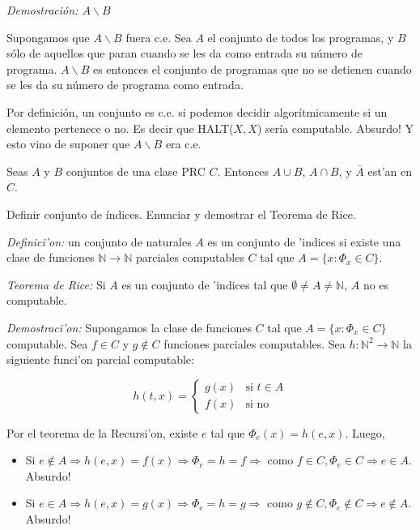 \begin{questions}
\begin{solution}
  {\it Demostraci\'on: $A\backslash B$}

  Supongamos que $A\backslash B$ fuera c.e. Sea $A$ el conjunto de todos los programas, y $B$ s\'olo de aquellos que paran cuando se les da como entrada su n\'umero de programa. $A\backslash B$ es entonces el conjunto de programas que no se detienen cuando se les da su n\'umero de programa como entrada. 
  
  Por definici\'on, un conjunto es c.e. si podemos decidir algor\'itmicamente si un elemento pertenece o no. Es decir que HALT($X,X$) ser\'ia computable. Absurdo! Y esto vino de suponer que $A\backslash B$ era c.e.
  
\end{solution}

\question Seas $A$ y $B$ conjuntos de una clase PRC $C$. Entonces $A\cup B$, $A\cap B$, y $\bar{A}$ est'an en $C$.

\question Definir conjunto de índices. Enunciar y demostrar el Teorema de Rice.


\begin{solution}
  
  {\it Definici'on:} un conjunto de naturales $A$ es un conjunto de 'indices si existe una clase de funciones $\mathbb{N} \rightarrow \mathbb{N}$ parciales computables $C$ tal que $A = \{ x : \Phi_x \in C \}$. 

  {\it Teorema de Rice:} Si $A$ es un conjunto de 'indices tal que $\emptyset \neq A \neq \mathbb{N}$, $A$ no es computable. 

  {\it Demostraci'on:} Supongamos la clase de funciones $C$ tal que $A = \{ x : \Phi_x \in C \}$ computable. Sea $f \in C$ y $g \notin C$ funciones parciales computables. Sea $h : \mathbb{N}^2 \rightarrow \mathbb{N}$ la siguiente funci'on parcial computable: 

  $$
  h(t,x) = \left\{
  \begin{array}{cl}
  g(x) & \mbox{si } t \in A \\
  f(x) & \mbox{si no}
  \end{array}\right.
  $$

  Por el teorema de la Recursi'on, existe $e$ tal que $\Phi_e(x) = h(e,x)$. Luego, 

  \begin{itemize}
  \item Si $e\notin A \Rightarrow h(e,x) = f(x)\Rightarrow \Phi_e=h=f\Rightarrow$ como $f\in C, \Phi_e \in C \Rightarrow e \in A$. Absurdo! 
  \item Si $e\in A \Rightarrow h(e,x) = g(x)\Rightarrow \Phi_e=h=g\Rightarrow$ como $g\notin C, \Phi_e \notin C \Rightarrow e \notin A$. Absurdo! 
  \end{itemize}


\end{solution}
\end{questions}

